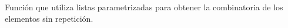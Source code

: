 Función que utiliza listas parametrizadas para obtener la combinatoria de los elementos sin repetición.